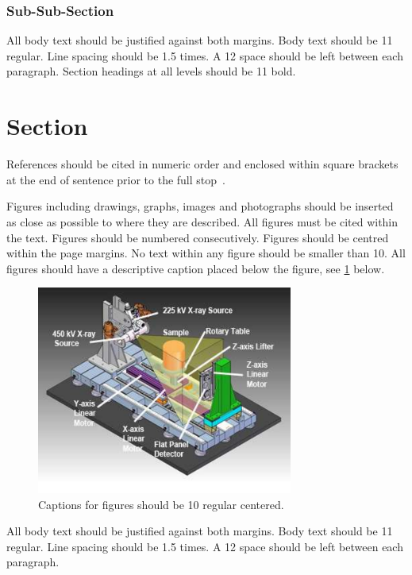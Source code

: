 \documentclass[a4paper,11pt]{article}
\begin{document}
\subsubsection{Sub-Sub-Section}

All body text should be justified against both margins. Body text should be
\qty{11}{\point} regular. Line spacing should be \num{1.5} times. A
\qty{12}{\point} space should be left between each paragraph. Section headings
at all levels should be \qty{11}{\point} bold.

\section{Section}

References should be cited in numeric order and enclosed within square brackets
at the end of sentence prior to the full stop~\cite{qi22}.

Figures including drawings, graphs, images and photographs should be inserted
as close as possible to where they are described. All figures must be cited
within the text. Figures should be numbered consecutively. Figures should be
centred within the page margins. No text within any figure should be smaller
than \qty{10}{\point}. All figures should have a descriptive caption placed
below the figure, see \cref{fig:bad} below. 

\begin{figure}[h]
  \centering
  \includegraphics[width=0.75\textwidth]{./fig/bad-fig.png}
  \caption{Captions for figures should be \qty{10}{\point} regular centered.
  }\label{fig:bad}
\end{figure}

All body text should be justified against both margins. Body text should be
\qty{11}{\point} regular. Line spacing should be \num{1.5} times. A
\qty{12}{\point} space should be left between each paragraph. 
\end{document}
